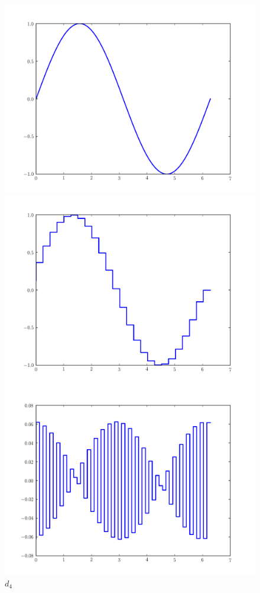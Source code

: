 \begin{figure}[t]
    \includegraphics[width=\linewidth]{sinecurve}
    \caption{$f(x) = \sin (x)$}
\endminipage\hfill
{}
    \includegraphics[width=\linewidth]{discreteSineCurve.pdf}
    \caption{$f_4$}
\endminipage\hfill
{}
    \includegraphics[width=\linewidth]{sineCurveDetail}
    \caption{$d_4$}
\endminipage
\end{figure}
